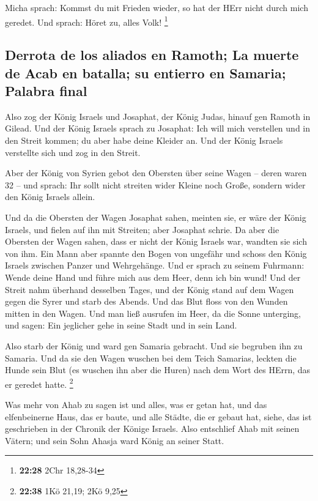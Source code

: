  Micha sprach: Kommst du mit Frieden wieder, so hat der
HErr nicht durch mich geredet. Und sprach: Höret zu, alles Volk!
\footnote{\textbf{22:28} 2Chr 18,28-34}

\hypertarget{derrota-de-los-aliados-en-ramoth-la-muerte-de-acab-en-batalla-su-entierro-en-samaria-palabra-final}{%
\subsection{Derrota de los aliados en Ramoth; La muerte de Acab en
batalla; su entierro en Samaria; Palabra
final}\label{derrota-de-los-aliados-en-ramoth-la-muerte-de-acab-en-batalla-su-entierro-en-samaria-palabra-final}}

 Also zog der König Israels und Josaphat, der König
Judas, hinauf gen Ramoth in Gilead.  Und der König
Israels sprach zu Josaphat: Ich will mich verstellen und in den Streit
kommen; du aber habe deine Kleider an. Und der König Israels verstellte
sich und zog in den Streit.

 Aber der König von Syrien gebot den Obersten über seine
Wagen -- deren waren 32 -- und sprach: Ihr sollt nicht streiten wider
Kleine noch Große, sondern wider den König Israels allein.

 Und da die Obersten der Wagen Josaphat sahen, meinten
sie, er wäre der König Israels, und fielen auf ihn mit Streiten; aber
Josaphat schrie.  Da aber die Obersten der Wagen sahen,
dass er nicht der König Israels war, wandten sie sich von ihm.
 Ein Mann aber spannte den Bogen von ungefähr und schoss
den König Israels zwischen Panzer und Wehrgehänge. Und er sprach zu
seinem Fuhrmann: Wende deine Hand und führe mich aus dem Heer, denn ich
bin wund!  Und der Streit nahm überhand desselben Tages,
und der König stand auf dem Wagen gegen die Syrer und starb des Abends.
Und das Blut floss von den Wunden mitten in den Wagen. 
Und man ließ ausrufen im Heer, da die Sonne unterging, und sagen: Ein
jeglicher gehe in seine Stadt und in sein Land.

 Also starb der König und ward gen Samaria gebracht. Und
sie begruben ihn zu Samaria.  Und da sie den Wagen
wuschen bei dem Teich Samarias, leckten die Hunde sein Blut (es wuschen
ihn aber die Huren) nach dem Wort des HErrn, das er geredet hatte.
\footnote{\textbf{22:38} 1Kö 21,19; 2Kö 9,25}

 Was mehr von Ahab zu sagen ist und alles, was er getan
hat, und das elfenbeinerne Haus, das er baute, und alle Städte, die er
gebaut hat, siehe, das ist geschrieben in der Chronik der Könige
Israels.  Also entschlief Ahab mit seinen Vätern; und
sein Sohn Ahasja ward König an seiner Statt.

